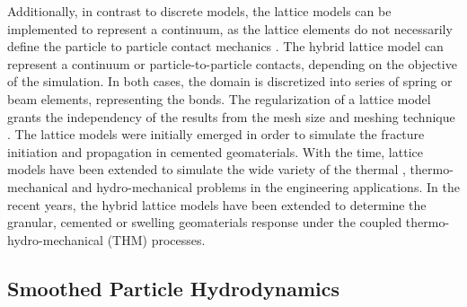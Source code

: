 Additionally, in contrast to discrete models, the lattice models can be implemented to represent a continuum, as the lattice elements do not necessarily define the particle to particle contact mechanics \cite{Rizvietal2019a}. The hybrid lattice model can represent a continuum or particle-to-particle contacts, depending on the objective of the simulation. In both cases, the domain is discretized into series of spring or beam elements, representing the bonds. The regularization of a lattice model grants the independency of the results from the mesh size and meshing technique \cite{Ostojastarzewski2002}. The lattice models were initially emerged in order to simulate the fracture initiation and propagation in cemented geomaterials. With the time, lattice models have been extended to simulate the wide variety of the thermal \cite{Shresthaetal2019, Rizvietal2019d, Rizvietal2016}, thermo-mechanical \cite{Sattarietal2017, Sattarietal2019b} and hydro-mechanical \cite{Grassl2009} problems in the engineering applications. In the recent years, the hybrid lattice models have been extended to determine the granular, cemented or swelling geomaterials response under the coupled thermo-hydro-mechanical (THM) processes.


\subsection{Smoothed Particle Hydrodynamics}

